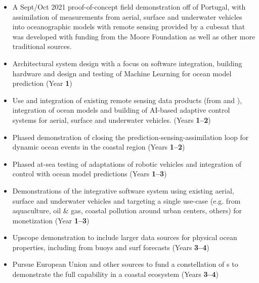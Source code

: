 
\begin{itemize}[noitemsep,topsep=0pt,parsep=5pt,partopsep=10pt]

\item A Sept/Oct 2021 proof-of-concept field demonstration off of
  Portugal, with assimilation of measurements from aerial, surface and
  underwater vehicles into oceanographic models with remote sensing
  provided by a cubesat that was developed with funding from the Moore
  Foundation as well as other more traditional sources.

\item Architectural system design with a focus on software
  integration, building hardware and design and testing of Machine
  Learning for ocean model prediction (Year \textbf{1})

\item Use and integration of existing remote sensing data products
  (from \esa and \nase), integration of ocean models and building of
  AI-based adaptive control systems for aerial, surface and underwater
  vehicles.  (Years \textbf{1--2})

\item Phased demonstration of closing the
  prediction-sensing-assimilation loop for dynamic ocean events in the
  coastal region (Years \textbf{1--2})

\item Phased at-sea testing of adaptations of robotic vehicles and
  integration of control with ocean model predictions (Years
  \textbf{1--3})

\item Demonstrations of the integrative software system using existing
  aerial, surface and underwater vehicles and targeting a single
  use-case (e.g. from aquaculture, oil \& gas, coastal pollution
  around urban centers, others) for monetization (Year \textbf{1--3})

\item Upscope demonstration to include larger data sources for
  physical ocean properties, including from buoys and surf forecasts
  (Years \textbf{3--4})


\item Pursue European Union and other sources to fund a constellation
  of \smle s to demonstrate the full capability in a coastal ecosystem
  (Years \textbf{3--4})
  
\end{itemize}

